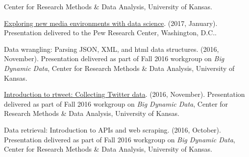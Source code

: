 \begin{bibenum}
      Center for Research Methods \& Data Analysis, University of Kansas.
    \item[] \href{https://mkearney.github.io/research_talk/pewtalk.html}{Exploring new media environments with data science}. (2017, January).
      Presentation delivered to the Pew Research Center, Washington, D.C..
    \item[] Data wrangling: Parsing JSON, XML, and html data structures. (2016, November).
      Presentation delivered as part of Fall 2016 workgroup on \textit{Big Dynamic Data},
      Center for Research Methods \& Data Analysis, University of Kansas.
    \item[] \href{https://github.com/mkearney/bigdata-workgroup}{Introduction to rtweet: Collecting Twitter data}. (2016, November).
      Presentation delivered as part of Fall 2016 workgroup on \textit{Big Dynamic Data},
      Center for Research Methods \& Data Analysis, University of Kansas.
    \item[] Data retrieval: Introduction to APIs and web scraping. (2016, October).
      Presentation delivered as part of Fall 2016 workgroup on \textit{Big Dynamic Data},
      Center for Research Methods \& Data Analysis, University of Kansas.
  \end{bibenum}
